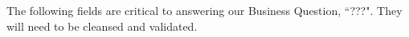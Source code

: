\documentclass{article}
\begin{document}



The following fields are critical to answering our Business Question, ``???".
They will need to be cleansed and validated.




\end{document}
